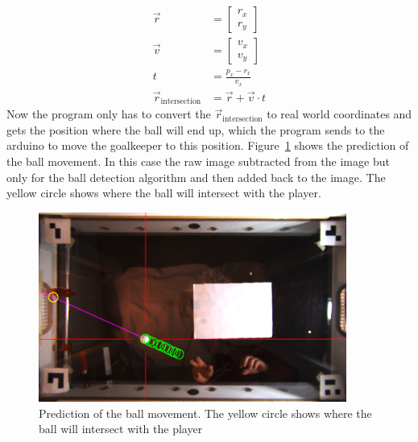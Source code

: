 \begin{equation}
    \begin{split}
        \vec{r} &= \begin{bmatrix}
                       r_x \\
                       r_y
        \end{bmatrix}\\
        \vec{v} &= \begin{bmatrix}
                       v_x \\
                       v_y
        \end{bmatrix}\\
        t &= \frac{p_x - r_x}{v_x}\\
        \vec{r}_\text{intersection} &= \vec{r} + \vec{v} \cdot t
    \end{split}\label{eq:ball_intersection}
\end{equation}
Now the program only has to convert the $\vec{r}_\text{intersection}$ to real world coordinates and gets the position where the ball will end up, which the program sends to the arduino to move the goalkeeper to this position.
Figure~\ref{fig:ball-prediction} shows the prediction of the ball movement.
In this case the raw image subtracted from the image but only for the ball detection algorithm and then added back to the image.
The yellow circle shows where the ball will intersect with the player.
\begin{figure}[H]
    \centering
    \includegraphics[width=0.9\textwidth]{../photos/ball_prediction2}
    \caption[ball-detection]{Prediction of the ball movement. The yellow circle shows where the ball will intersect with the player}
    \label{fig:ball-prediction}
\end{figure}

